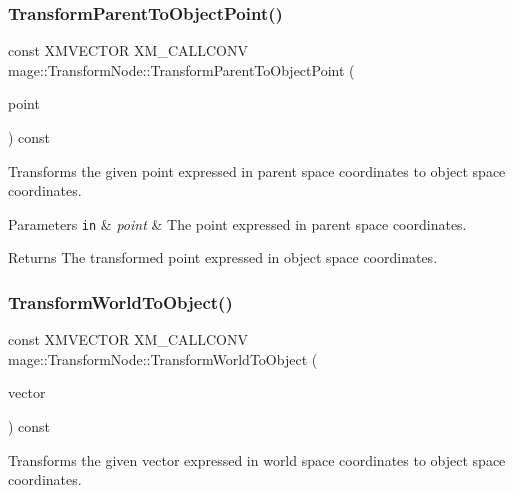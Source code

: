 \subsubsection{\texorpdfstring{Transform\+Parent\+To\+Object\+Point()}{TransformParentToObjectPoint()}}
{\footnotesize\ttfamily const X\+M\+V\+E\+C\+T\+OR X\+M\+\_\+\+C\+A\+L\+L\+C\+O\+NV mage\+::\+Transform\+Node\+::\+Transform\+Parent\+To\+Object\+Point (\begin{DoxyParamCaption}\item[{F\+X\+M\+V\+E\+C\+T\+OR}]{point }\end{DoxyParamCaption}) const\hspace{0.3cm}{\ttfamily [noexcept]}}

Transforms the given point expressed in parent space coordinates to object space coordinates.


\begin{DoxyParams}[1]{Parameters}
\mbox{\tt in}  & {\em point} & The point expressed in parent space coordinates. \\
\hline
\end{DoxyParams}
\begin{DoxyReturn}{Returns}
The transformed point expressed in object space coordinates. 
\end{DoxyReturn}
\hypertarget{classmage_1_1_transform_node_a20d7ef8d49095a4ffddf508cad7d89d1}{}\label{classmage_1_1_transform_node_a20d7ef8d49095a4ffddf508cad7d89d1} 
\subsubsection{\texorpdfstring{Transform\+World\+To\+Object()}{TransformWorldToObject()}}
{\footnotesize\ttfamily const X\+M\+V\+E\+C\+T\+OR X\+M\+\_\+\+C\+A\+L\+L\+C\+O\+NV mage\+::\+Transform\+Node\+::\+Transform\+World\+To\+Object (\begin{DoxyParamCaption}\item[{F\+X\+M\+V\+E\+C\+T\+OR}]{vector }\end{DoxyParamCaption}) const\hspace{0.3cm}{\ttfamily [noexcept]}}

Transforms the given vector expressed in world space coordinates to object space coordinates.


